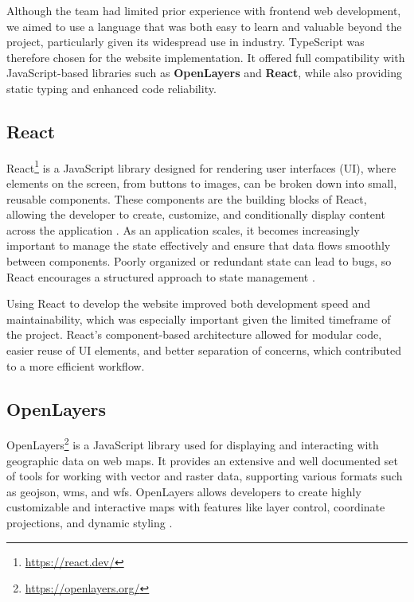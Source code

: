 Although the team had limited prior experience with frontend web development, we aimed to use a language that was both easy to learn and valuable beyond the project, particularly given its widespread use in industry. TypeScript was therefore chosen for the website implementation. It offered full compatibility with JavaScript-based libraries such as \textbf{OpenLayers} and \textbf{React}, while also providing static typing and enhanced code reliability.

\subsection{React}\label{subsec:implementation:technologies:react}

React\footnote{\url{https://react.dev/}} is a JavaScript library designed for rendering user interfaces (UI), where elements on the screen, from buttons to images, can be broken down into small, reusable components. These components are the building blocks of React, allowing the developer to create, customize, and conditionally display content across the application \cite{react_component}. As an application scales, it becomes increasingly important to manage the state effectively and ensure that data flows smoothly between components. Poorly organized or redundant state can lead to bugs, so React encourages a structured approach to state management \cite{react_managing_state}. 

Using React to develop the website improved both development speed and maintainability, which was especially important given the limited timeframe of the project. React's component-based architecture allowed for modular code, easier reuse of UI elements, and better separation of concerns, which contributed to a more efficient workflow.

\subsection{OpenLayers}

OpenLayers\footnote{\url{https://openlayers.org/}} is a JavaScript library used for displaying and interacting with geographic data on web maps. It provides an extensive and well documented set of tools for working with vector and raster data, supporting various formats such as \Gls{geojson}, \Gls{wms}, and \Gls{wfs}. OpenLayers allows developers to create highly customizable and interactive maps with features like layer control, coordinate projections, and dynamic styling \cite{openlayers}.

